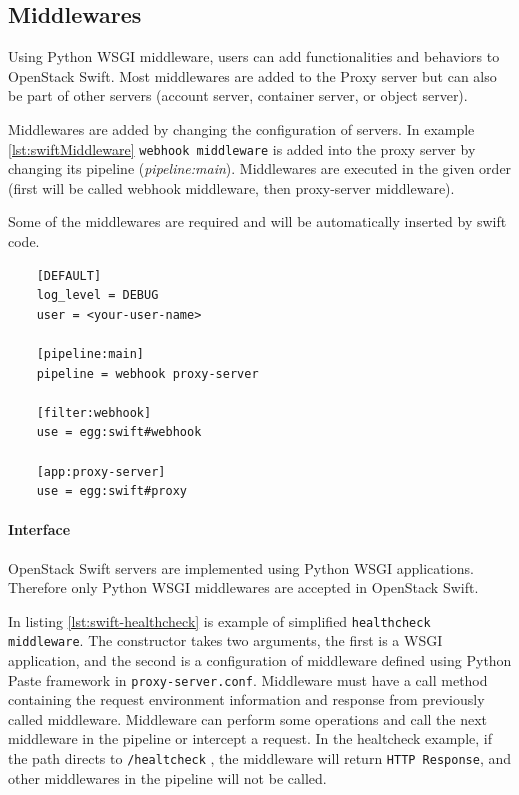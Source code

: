     \subsection{Middlewares}
    Using Python WSGI middleware, users can add functionalities and behaviors to OpenStack Swift. Most middlewares are added to the Proxy server but can also be part of other servers (account server, container server, or object server).

    Middlewares are added by changing the configuration of servers. In example \ref{lst:swiftMiddleware}
    \texttt{webhook middleware} is added into the proxy server by changing its pipeline (\textit{pipeline:main}). Middlewares are executed in the given order (first will be called webhook middleware, then proxy-server middleware).

    Some of the middlewares are required and will be automatically inserted by swift code\cite{swiftMiddleware}.

    \lstset{
        caption=Example of proxy server configuration (proxy-server.conf).,
        label=lst:swiftMiddleware
    }
    \begin{lstlisting}
    [DEFAULT]
    log_level = DEBUG
    user = <your-user-name>

    [pipeline:main]
    pipeline = webhook proxy-server

    [filter:webhook]
    use = egg:swift#webhook

    [app:proxy-server]
    use = egg:swift#proxy
    \end{lstlisting}

    \paragraph{Interface}
    OpenStack Swift servers are implemented using Python WSGI applications. Therefore only Python WSGI middlewares are accepted in OpenStack Swift.

    In listing \ref{lst:swift-healthcheck} is example of simplified \texttt{healthcheck middleware}. The constructor takes two arguments, the first is a WSGI application, and the second is a configuration of middleware defined using Python Paste framework in \texttt{proxy-server.conf}. Middleware must have a call method containing the request environment information and response from previously called middleware. Middleware can perform some operations and call the next middleware in the pipeline or intercept a request. In the healtcheck example, if the path directs to \texttt{/healtcheck} , the middleware will return \texttt{HTTP Response}, and other middlewares in the pipeline will not be called.

